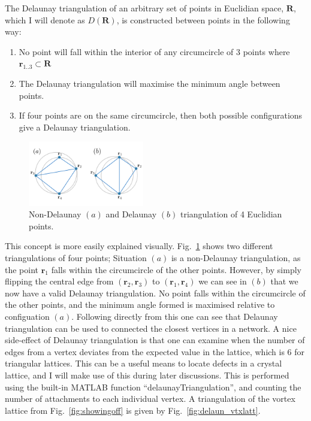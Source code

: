 {The Delaunay triangulation of an arbitrary set of points in Euclidian space, $\mathbf{R}$, which I will denote as $D(\mathbf{R})$, is constructed between points in the following way:
\begin{enumerate}
    \item No point will fall within the interior of any circumcircle of 3 points where $\mathbf{r}_{1..3} \subset \mathbf{R}$
    \item The Delaunay triangulation will maximise the minimum angle between points.
    \item If four points are on the same circumcircle, then both possible configurations give a Delaunay triangulation.
\end{enumerate}

\begin{figure}\centering
    \includegraphics[width=0.45\textwidth]{Images/ch6_phasegineer/imgs/delaun}
    \caption{Non-Delaunay $(a)$ and Delaunay $(b)$ triangulation of 4 Euclidian points.}\label{fig:delaun}
\end{figure}
This concept is more easily explained visually. Fig.~\ref{fig:delaun} shows two different triangulations of four points; Situation $(a)$ is a non-Delaunay triangulation, as the point $\mathbf{r}_1$ falls within the circumcircle of the other points. However, by simply flipping the central edge from $(\mathbf{r}_2, \mathbf{r}_3)$ to $(\mathbf{r}_1, \mathbf{r}_4)$ we can see in $(b)$ that we now have a valid Delaunay triangulation. No point falls within the circumcircle of the other points, and the minimum angle formed is maximised relative to configuation $(a)$. Following directly from this one can see that Delaunay triangulation can be used to connected the closest vertices in a network. A nice side-effect of Delaunay triangulation is that one can examine when the number of edges from a vertex deviates from the expected value in the lattice, which is 6 for triangular lattices. This can be a useful means to locate defects in a crystal lattice, and I will make use of this during later discussions. This is performed using the built-in \textsc{MATLAB} function ``delaunayTriangulation'', and counting the number of attachments to each individual vertex. A triangulation of the vortex lattice from Fig.~\ref{fig:showingoff} is given by Fig.~\ref{fig:delaun_vtxlatt}.

}
